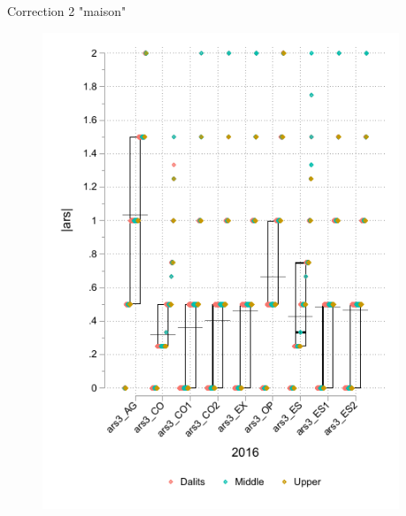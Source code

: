 \documentclass[aspectratio=169]{beamer}
\begin{document}
\begin{frame}[plain, shrink=2]{Correction 2 "maison"}
\begin{figure}[H]
    \centering
    \begin{columns}[T]
        \begin{column}{.5\linewidth}
            \includegraphics[width=\linewidth]{INPUT/boxplotars2016_det.pdf}
        \end{column}
        \begin{column}{.5\linewidth}

\end{column}
\end{columns}
\end{figure}
\end{frame}
\end{document}
